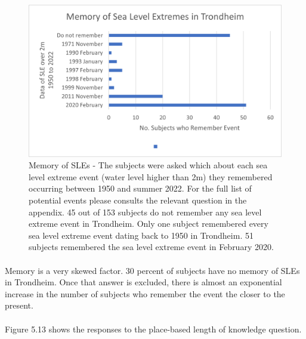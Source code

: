 \begin{figure}[H]
    \centering
    \includegraphics{fig_results/memory-sle.png}
    \caption{Memory of SLEs - The subjects were asked which about each sea level extreme event (water level higher than 2m) they remembered occurring between 1950 and summer 2022. For the full list of potential events please consults the relevant question in the appendix. 45 out of 153 subjects do not remember any sea level extreme event in Trondheim. Only one subject remembered every sea level extreme event dating back to 1950 in Trondheim. 51 subjects remembered the sea level extreme event in February 2020. }
    \label{fig:my_label}
\end{figure}
\paragraph{}

Memory is a very skewed factor. 30 percent of subjects have no memory of SLEs in Trondheim. Once that answer is excluded, there is almost an exponential increase in the number of subjects who remember the event the closer to the present. 
\paragraph{}
Figure 5.13 shows the responses to the place-based length of knowledge question.

